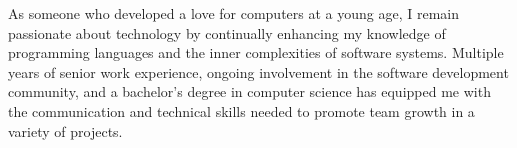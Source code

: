 

\begin{cvparagraph}

    As someone who developed a love for computers at a young age, I remain passionate about technology by
    continually enhancing my knowledge of programming languages and the inner complexities of software systems.
    Multiple years of senior work experience, ongoing involvement in the software development community, and a
    bachelor's degree in computer science has equipped me with the communication and technical skills needed to promote
    team growth in a variety of projects.
\end{cvparagraph}
